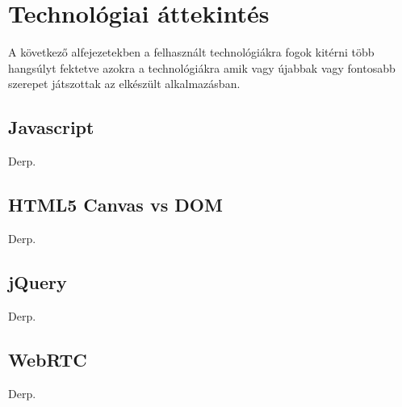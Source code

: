 



\chapter{Technológiai áttekintés}
A következő alfejezetekben a felhasznált technológiákra fogok kitérni több hangsúlyt fektetve azokra a technológiákra amik vagy újabbak vagy fontosabb szerepet játszottak az elkészült alkalmazásban.


\section{Javascript}
Derp.

\section{HTML5 Canvas vs DOM}
Derp.



\section{jQuery}
Derp.







\section{WebRTC}
Derp.

